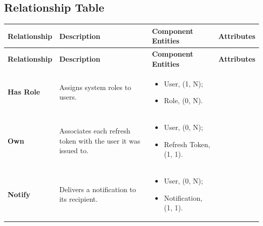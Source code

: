 \subsection{Relationship Table}
{\small
\begin{longtable}{|p{}|p{}|p{}|p{}|}
    \hline
    \textbf{Relationship} & \textbf{Description} & \textbf{Component Entities} & \textbf{Attributes} \\\hline
    \endfirsthead
    \hline
    \textbf{Relationship} & \textbf{Description} & \textbf{Component Entities} & \textbf{Attributes} \\\hline
    \endhead

    \textbf{Has Role} & Assigns system roles to users. &
    \begin{itemize}[leftmargin=*,nosep,before=\vspace{-\baselineskip}\leavevmode,after=\vspace{-\baselineskip}]
        \item User, (1, N);
        \item Role, (0, N).
    \end{itemize}
    &
    
    \\ \hline

    \textbf{Own} & Associates each refresh token with the user it was issued to. &
    \begin{itemize}[leftmargin=*,nosep,before=\vspace{-\baselineskip}\leavevmode,after=\vspace{-\baselineskip}]
        \item User, (0, N);
        \item Refresh Token, (1, 1).
    \end{itemize}
    &
    
    \\ \hline

    \textbf{Notify} & Delivers a notification to its recipient. &
    \begin{itemize}[leftmargin=*,nosep,before=\vspace{-\baselineskip}\leavevmode,after=\vspace{-\baselineskip}]
        \item User, (0, N);
        \item Notification, (1, 1).
    \end{itemize}
    &
    
    \\ \hline


\end{longtable}}
